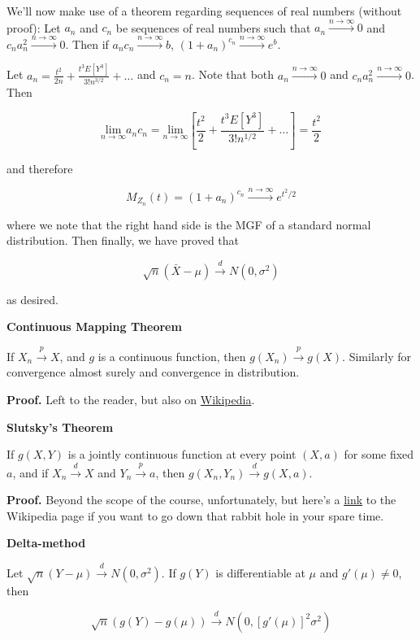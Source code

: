 \documentclass[
  letterpaper,
  DIV=11,
  numbers=noendperiod]{scrreprt}
\begin{document}
We'll now make use of a theorem regarding sequences of real numbers
(without proof): Let \(a_n\) and \(c_n\) be sequences of real numbers
such that \(a_n \overset{n \to \infty}{\to} 0\) and
\(c_na_n^2 \overset{n \to \infty}{\to} 0\). Then if
\(a_nc_n \overset{n \to \infty}{\to} b\),
\((1 + a_n)^{c_n} \overset{n \to \infty}{\to} e^b\).

Let \(a_n = \frac{t^2}{2n} + \frac{t^3E[Y^3]}{3!n^{3/2}} + \dots\) and
\(c_n = n\). Note that both \(a_n \overset{n \to \infty}{\to} 0\) and
\(c_na_n^2 \overset{n \to \infty}{\to} 0\). Then

\[
\underset{n \to \infty}{\text{lim}} a_n c_n = \underset{n \to \infty}{\text{lim}} \left[ \frac{t^2}{2} + \frac{t^3E[Y^3]}{3!n^{1/2}} + \dots\right] = \frac{t^2}{2}
\]

and therefore

\[
M_{Z_n}(t) = (1 + a_n)^{c_n} \overset{n \to \infty}{\to} e^{t^2/2}
\]

where we note that the right hand side is the MGF of a standard normal
distribution. Then finally, we have proved that

\[
\sqrt{n}(\bar{X} - \mu) \overset{d}{\to} N(0, \sigma^2)
\]

as desired.

\textbf{Continuous Mapping Theorem}

If \(X_n \overset{p}{\to} X\), and \(g\) is a continuous function, then
\(g(X_n) \overset{p}{\to} g(X)\). Similarly for convergence almost
surely and convergence in distribution.

\textbf{Proof.} Left to the reader, but also on
\href{https://en.wikipedia.org/wiki/Continuous_mapping_theorem\#Proof}{Wikipedia}.

\textbf{Slutsky's Theorem}

If \(g(X, Y)\) is a jointly continuous function at every point
\((X, a)\) for some fixed \(a\), and if \(X_n \overset{d}{\to} X\) and
\(Y_n \overset{p}{\to} a\), then
\(g(X_n, Y_n) \overset{d}{\to} g(X, a)\).

\textbf{Proof.} Beyond the scope of the course, unfortunately, but
here's a
\href{https://en.wikipedia.org/wiki/Slutsky\%27s_theorem\#Proof}{link}
to the Wikipedia page if you want to go down that rabbit hole in your
spare time.

\textbf{Delta-method}

Let \(\sqrt{n} (Y - \mu) \overset{d}{\to} N(0, \sigma^2)\). If \(g(Y)\)
is differentiable at \(\mu\) and \(g'(\mu) \neq 0\), then

\[
\sqrt{n} \left( g(Y) - g(\mu)\right) \overset{d}{\to} N(0, [g'(\mu)]^2 \sigma^2)
\]
\end{document}
